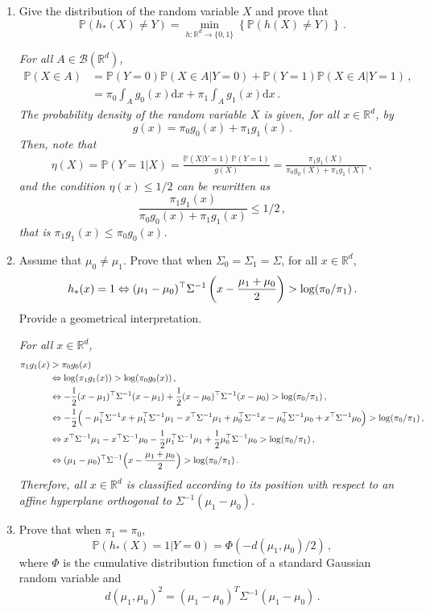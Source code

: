 \documentclass[a4paper,10pt,fleqn]{article}
\newcommand{\eqsp}{\,}
\newcommand{\rmd}{\mathrm{d}}
\newcommand{\rset}{\ensuremath{\mathbb{R}}}
\newcommand{\bP}{\mathbb{P}}
\newcommand{\1}{\ensuremath{\mathbbm{1}}}
\begin{document}
\begin{enumerate}
\item Give the distribution of the random variable $X$ and prove that 
\[
\bP(h_{*}(X)\neq Y)=\min_{h:\rset^d\to \{0,1\}}\left\{\bP(h(X)\neq Y)\right\}\eqsp.
\]

\vspace{.2cm}

{\em
For all $A\in \mathcal{B}(\rset^d)$,
\begin{align*}
\bP(X \in A) & = \bP (Y = 0) \bP(X \in A | Y=0) + \bP (Y = 1) \bP(X \in A | Y=1)\eqsp, \\
& = \pi_0 \int_A g_0 (x)\rmd x + \pi_1 \int_A g_1(x)\rmd x\eqsp.
\end{align*}
The probability density of the random variable $X$ is given, for all $x\in\rset^d$, by
\[
g(x) = \pi_0 g_0 (x) + \pi_1  g_1(x)\eqsp.
\]
Then, note that 
\begin{align*}
\eta(X) = \bP(Y=1|X) = \frac{\bP(X| Y=1)\eqsp \bP(Y=1)}{g(X)} =  \frac{\pi_1 g_1(X)}{\pi_0 g_0(X) + \pi_1 g_1(X)}\eqsp,
\end{align*}
and the condition $\eta(x) \leqslant 1/2$ can be rewritten as
\[
\frac{\pi_1 g_1(x)}{\pi_0 g_0(x) + \pi_1 g_1(x)} \leqslant 1/2\eqsp,
\]
that is $\pi_1 g_1(x) \leqslant \pi_0 g_0(x)$.
}
\item Assume that  $\mu_0\ne\mu_1$. Prove that when $\Sigma_0=\Sigma_1=\Sigma$, for all $x\in\rset^d$,
\[
h_{*}(x) = 1 \Leftrightarrow (\mu_{1}-\mu_{0})^\top\Sigma^{-1}\left(x-{\mu_{1}+\mu_{0}\over2}\right)>\log(\pi_{0}/\pi_{1})\eqsp.
\]
Provide a geometrical interpretation.

\vspace{.2cm}

{\em 
For all $x\in\rset^d$, 
\begin{align*}
 \pi_1 g_1(x) &> \pi_0 g_0(x) \\
&\Leftrightarrow  \log(\pi_1 g_1(x)) > \log(\pi_0 g_0(x))\eqsp,\\
&\Leftrightarrow  -{1\over 2}(x-\mu_1)^\top\Sigma^{-1}(x-\mu_1) + {1\over 2}(x-\mu_0)^\top\Sigma^{-1}(x-\mu_0) > \log(\pi_0/ \pi_1)\eqsp,\\
&\Leftrightarrow  -{1\over 2}\Big(  -\mu_1^\top\Sigma^{-1}x + \mu_1^\top\Sigma^{-1}\mu_1  - x^\top\Sigma^{-1}\mu_1  +\mu_0^\top\Sigma^{-1}x - \mu_0^\top\Sigma^{-1}\mu_0 + x^\top\Sigma^{-1}\mu_0\Big)> \log(\pi_0/ \pi_1)\eqsp,\\
&\Leftrightarrow		 x^\top\Sigma^{-1}\mu_1 - x^\top\Sigma^{-1}\mu_0 - \frac{1}{2} \mu_1^\top\Sigma^{-1}\mu_1 + \frac{1}{2} \mu_0^\top\Sigma^{-1}\mu_0  > \log(\pi_0/ \pi_1)\eqsp,\\
&\Leftrightarrow		 (\mu_1 - \mu_0)^\top \Sigma^{-1} \Big(x - \frac{\mu_1 + \mu_0}{2}\Big)  > \log(\pi_0/ \pi_1)\eqsp.
\end{align*}
Therefore, all $x\in\rset^d$ is classified according to its position with respect to an affine hyperplane orthogonal to $\Sigma^{-1}(\mu_1-\mu_{0})$.
}
\item Prove that when $\pi_{1}=\pi_{0}$, 
\[
\bP(h_{*}(X)=1|Y=0)=\Phi(-d(\mu_{1},\mu_{0})/2)\eqsp,
\] 
where $\Phi$ is the cumulative distribution function of a standard Gaussian random variable  and 
\[
d(\mu_{1},\mu_{0})^2=(\mu_{1}-\mu_{0})^T\Sigma^{-1}(\mu_{1}-\mu_{0})\eqsp.
\]


\end{enumerate}
\end{document}
